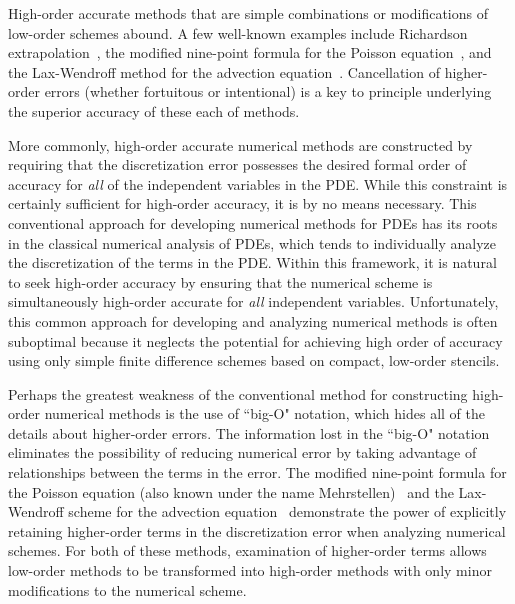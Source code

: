 \documentclass[oneeqnum,onefignum,onetabnum,onethmnum]{siamltex}
\begin{document}
High-order accurate methods that are simple combinations or modifications of 
low-order schemes abound.  A few well-known examples include Richardson 
extrapolation~\cite{richardson_1927,heath_book}, the modified nine-point 
formula for the Poisson equation~\cite{iserles_book}, and the Lax-Wendroff 
method for the advection equation~\cite{leveque_book_1992, leveque_book_2002,
gko_book}.  Cancellation of higher-order errors (whether fortuitous or 
intentional) is a key to principle underlying the superior accuracy of these 
each of methods.

More commonly, high-order accurate numerical methods are constructed by 
requiring that the discretization error possesses the desired formal order of 
accuracy for \emph{all} of the independent variables in the PDE.  While this 
constraint is certainly sufficient for high-order accuracy, it is by no means 
necessary.  This conventional approach for developing numerical methods for 
PDEs has its roots in the classical numerical analysis of PDEs, which tends to 
individually analyze the discretization of the terms in the PDE.  Within this 
framework, it is natural to seek high-order accuracy by ensuring that the 
numerical scheme is simultaneously high-order accurate for \emph{all} 
independent variables.  Unfortunately, this common approach for developing 
and analyzing numerical methods is often suboptimal because it neglects the 
potential for achieving high order of accuracy using only simple finite 
difference schemes based on compact, low-order stencils.

Perhaps the greatest weakness of the conventional method for constructing 
high-order numerical methods is the use of ``big-O" notation, which hides all 
of the details about higher-order errors.  The information lost in the ``big-O" 
notation eliminates the possibility of reducing numerical error by taking 
advantage of relationships between the terms in the error.  The modified 
nine-point formula for the Poisson equation (also known under the name 
Mehrstellen)~\cite{iserles_book} and the Lax-Wendroff scheme for the 
advection equation~\cite{leveque_book_1992, leveque_book_2002, gko_book} 
demonstrate the power of explicitly retaining higher-order terms in the 
discretization error when analyzing numerical schemes.  For both of these 
methods, examination of higher-order terms allows low-order methods to be 
transformed into high-order methods with only minor modifications to the 
numerical scheme.  
\end{document}
